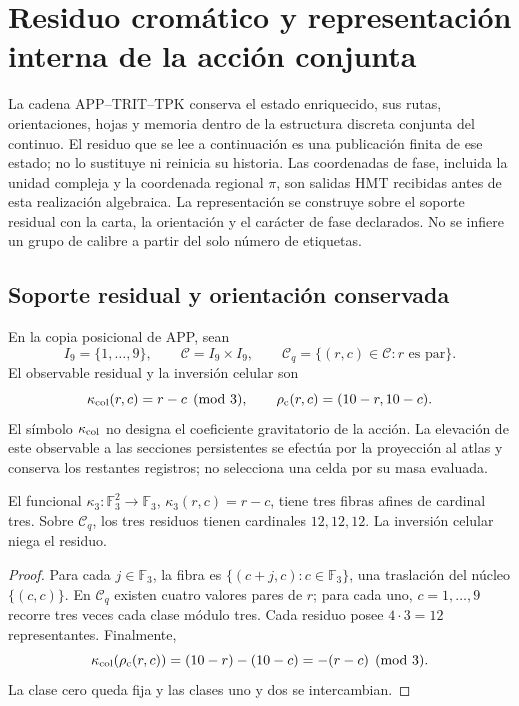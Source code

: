 \section{Residuo cromático y representación interna de la acción conjunta}
\label{hmtcuatro:color:seccion}

La cadena APP--TRIT--TPK conserva el estado enriquecido, sus rutas,
orientaciones, hojas y memoria dentro de la estructura discreta conjunta
del continuo. El residuo que se lee a continuación es una publicación
finita de ese estado; no lo sustituye ni reinicia su historia. Las
coordenadas de fase, incluida la unidad compleja y la coordenada regional
\(\pi\), son salidas HMT recibidas antes de esta realización algebraica.
La representación se construye sobre el soporte residual con la carta,
la orientación y el carácter de fase declarados. No se infiere un grupo
de calibre a partir del solo número de etiquetas.

\subsection{Soporte residual y orientación conservada}
\label{hmtcuatro:color:residuo}

En la copia posicional de APP, sean
\[
 I_9=\{1,\ldots,9\},\qquad
 \mathcal C=I_9\times I_9,\qquad
 \mathcal C_q=\{(r,c)\in\mathcal C:r\text{ es par}\}.
\]
El observable residual y la inversión celular son
\[
 \kappa_{\rm col}(r,c)=r-c\pmod3,\qquad
 \rho_{\rm c}(r,c)=(10-r,10-c).
\]
El símbolo \(\kappa_{\rm col}\) no designa el coeficiente gravitatorio
de la acción. La elevación de este observable a las secciones
persistentes se efectúa por la proyección al atlas y conserva los
restantes registros; no selecciona una celda por su masa evaluada.

\begin{proposition}
\label{hmtcuatro:color:balance}
El funcional \(\kappa_3:\mathbb F_3^2\to\mathbb F_3\),
\(\kappa_3(r,c)=r-c\), tiene tres fibras afines de cardinal tres.
Sobre \(\mathcal C_q\), los tres residuos tienen cardinales
\(12,12,12\). La inversión celular niega el residuo.
\end{proposition}
\begin{proof}
Para cada \(j\in\mathbb F_3\), la fibra es
\(\{(c+j,c):c\in\mathbb F_3\}\), una traslación del núcleo
\(\{(c,c)\}\). En \(\mathcal C_q\) existen cuatro valores pares
de \(r\); para cada uno, \(c=1,\ldots,9\) recorre tres veces
cada clase módulo tres. Cada residuo posee \(4\cdot3=12\)
representantes. Finalmente,
\[
 \kappa_{\rm col}(\rho_{\rm c}(r,c))
 =(10-r)-(10-c)=-(r-c)\pmod3.
\]
La clase cero queda fija y las clases uno y dos se intercambian.
\end{proof}

